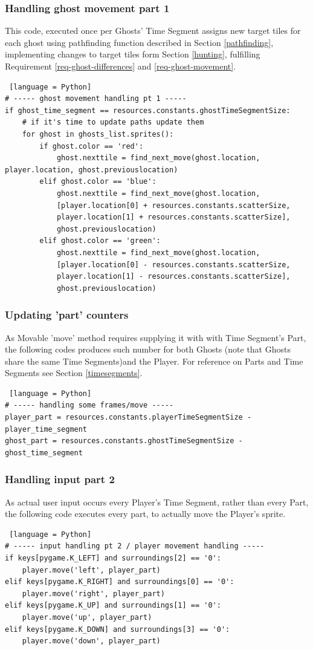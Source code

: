 \documentclass[11pt,a4paper,notitlepage]{report}
\begin{document}
				\subsubsection{Handling ghost movement part 1}
					This code, executed once per Ghosts' Time Segment assigns new target tiles for each ghost using pathfinding function described in Section \ref{pathfinding}, implementing changes to target tiles form Section \ref{hunting}, fulfilling Requirement \ref{req-ghost-differences} and \ref{req-ghost-movement}.
					\begin{lstlisting} [language = Python]
# ----- ghost movement handling pt 1 -----
if ghost_time_segment == resources.constants.ghostTimeSegmentSize:
	# if it's time to update paths update them
	for ghost in ghosts_list.sprites():
		if ghost.color == 'red':
			ghost.nexttile = find_next_move(ghost.location, player.location, ghost.previouslocation)
		elif ghost.color == 'blue':
			ghost.nexttile = find_next_move(ghost.location,
			[player.location[0] + resources.constants.scatterSize,
			player.location[1] + resources.constants.scatterSize],
			ghost.previouslocation)
		elif ghost.color == 'green':
			ghost.nexttile = find_next_move(ghost.location,
			[player.location[0] - resources.constants.scatterSize,
			player.location[1] - resources.constants.scatterSize],
			ghost.previouslocation)
					\end{lstlisting}
				\subsubsection{Updating 'part' counters}
					As Movable 'move' method requires supplying it with with Time Segment's Part, the following codes produces such number for both Ghosts (note that Ghosts share the same Time Segments)and the Player. For reference on Parts and Time Segments see Section \ref{timesegments}.
					\begin{lstlisting} [language = Python]
# ----- handling some frames/move -----
player_part = resources.constants.playerTimeSegmentSize - player_time_segment
ghost_part = resources.constants.ghostTimeSegmentSize - ghost_time_segment
					\end{lstlisting}
				\subsubsection{Handling input part 2}
					As actual user input occurs every Player's Time Segment, rather than every Part, the following code executes every part, to actually move the Player's sprite.
					\begin{lstlisting} [language = Python]
# ----- input handling pt 2 / player movement handling -----
if keys[pygame.K_LEFT] and surroundings[2] == '0':
	player.move('left', player_part)
elif keys[pygame.K_RIGHT] and surroundings[0] == '0':
	player.move('right', player_part)
elif keys[pygame.K_UP] and surroundings[1] == '0':
	player.move('up', player_part)
elif keys[pygame.K_DOWN] and surroundings[3] == '0':
	player.move('down', player_part)
					\end{lstlisting}
\end{document}
